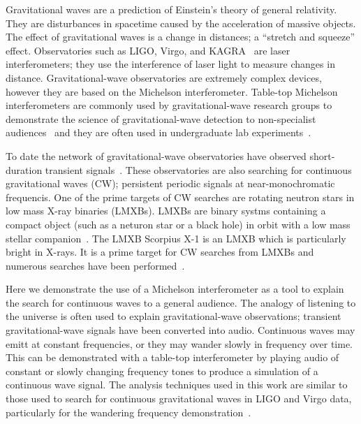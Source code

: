 \documentclass[prb,preprint]{revtex4-1}
\begin{document}
Gravitational waves are a prediction of Einstein's theory of general relativity. 
They are disturbances in spacetime caused by the acceleration of massive objects. 
The effect of gravitational waves is a change in distances; a ``stretch and squeeze'' effect. 
Observatories such as LIGO, Virgo, and KAGRA~\cite{KAGRA:2013} are laser interferometers; they use the interference of laser light to measure changes in distance. 
Gravitational-wave observatories are extremely complex devices, however they are based on the Michelson interferometer. 
Table-top Michelson interferometers are commonly used by gravitational-wave research groups to demonstrate the science of gravitational-wave detection to non-specialist audiences~\cite{ThorLabsIFO,NikhefIFO,ExhibitIFO,LIGOIFOGlue,LIGOIFOMagnets} and they are often used in undergraduate lab experiments~\cite{UgoliniEtAl:2019}. 

To date the network of gravitational-wave observatories have observed short-duration transient signals~\cite{GWTC-1:2018,GWOSC:online}. 
These observatories are also searching for continuous gravitational waves (CW); persistent periodic signals at near-monochromatic frequencis. 
One of the prime targets of CW searches are rotating neutron stars in low mass X-ray binaries (LMXBs).
LMXBs are binary systms containing a compact object (such as a neturon star or a black hole) in orbit with a low mass stellar companion~\cite{xraybinaries:1997}. 
The LMXB Scorpius X-1 is an LMXB which is particularly bright in X-rays. 
It is a prime target for CW searches from LMXBs and numerous searches have been performed~\cite{2019PhRvD.100l2002A,RadiometerO1O2:2019,SearchCrossCorrO1:2017}. 
 
Here we demonstrate the use of a Michelson interferometer as a tool to explain the search for continuous waves to a general audience.
The analogy of listening to the universe is often used to explain gravitational-wave observations; transient gravitational-wave signals have been converted into audio.
Continuous waves may emitt at constant frequencies, or they may wander slowly in frequency over time. 
This can be demonstrated with a table-top interferometer by playing audio of constant or slowly changing frequency tones to produce a simulation of a continuous wave signal. 
The analysis techniques used in this work are similar to those used to search for continuous gravitational waves in LIGO and Virgo data, particularly for the wandering frequency demonstration~\cite{ScoX1ViterbiO2,ScoX1ViterbiO1:2017,SuvorovaEtAl:2017,SuvorovaEtAl:2017}. 
\end{document}
